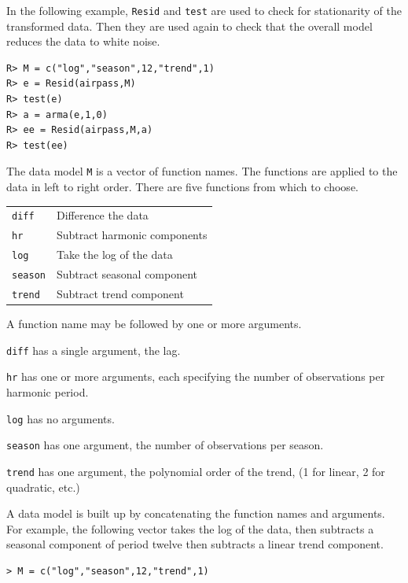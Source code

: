 \documentclass[12pt]{article}
\begin{document}
\bigskip
\noindent
In the following example, {\tt Resid} and {\tt test}
are used
to check for stationarity of the transformed
data.
Then they are used again to check that the overall
model reduces the data to white noise.

\begin{verbatim}
R> M = c("log","season",12,"trend",1)
R> e = Resid(airpass,M)
R> test(e)
R> a = arma(e,1,0)
R> ee = Resid(airpass,M,a)
R> test(ee)
\end{verbatim}

\noindent
The data model {\tt M} is a vector of function names.
The functions are applied to the data in left to right order.
There are five functions from which to choose.

\begin{center}
\begin{tabular}{ll}
{\tt diff} & Difference the data\\
{\tt hr} & Subtract harmonic components\\
{\tt log} & Take the log of the data\\
{\tt season} & Subtract seasonal component\\
{\tt trend} & Subtract trend component\\
\end{tabular}
\end{center}

\noindent
A function name may be followed by one or more arguments.

\medskip
\noindent
{\tt diff} has a single argument, the lag.

\medskip
\noindent
{\tt hr} has one or more arguments, each specifying the number
of observations per harmonic period.

\medskip
\noindent
{\tt log} has no arguments.

\medskip
\noindent
{\tt season} has one argument, the number of observations per season.

\medskip
\noindent
{\tt trend} has one argument, the polynomial order of the trend,
(1 for linear, 2 for quadratic, etc.)

\bigskip
\noindent
A data model is built up by concatenating the function
names and arguments. For example, the following vector takes the
log of the data, then subtracts a seasonal component of period twelve
then subtracts a linear trend component.

\begin{verbatim}
> M = c("log","season",12,"trend",1)
\end{verbatim}
\end{document}
